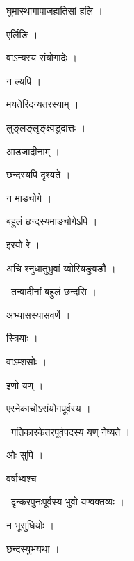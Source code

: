 \documentclass[10pt, openany, oneside]{book}
\begin{document}
\noindent घुमास्थागापाजहातिसां हलि ।

\noindent एर्लिङि ।

\noindent वाऽन्यस्य संयोगादेः ।

\noindent न ल्यपि ।

\noindent मयतेरिदन्यतरस्याम् ।

\noindent लुङ्लङ्लृङ्क्ष्वडुदात्तः ।

\noindent आडजादीनाम् ।

\noindent छन्दस्यपि दृश्यते ।

\noindent न माङ्योगे ।

\noindent बहुलं छन्दस्यमाङ्योगेऽपि ।

\noindent इरयो रे ।

\noindent अचि श्नुधातुभ्रुवां य्वोरियङुवङौ ।

\par\noindent\hspace{1.5em}{\vps वा॰}~{\qt तन्वादीनां बहुलं छन्दसि ।}

\noindent अभ्यासस्यासवर्णे ।

\noindent स्त्रियाः ।

\noindent वाऽम्शसोः ।

\noindent इणो यण् ।

\noindent एरनेकाचोऽसंयोगपूर्वस्य ।

\par\noindent\hspace{1.5em}{\vps वा॰}~{\qt गतिकारकेतरपूर्वपदस्य यण् नेष्यते ।}

\noindent ओः सुपि ।

\noindent वर्षाभ्वश्च ।

\par\noindent\hspace{1.5em}{\vps वा॰}~{\qt दृन्करपुनःपूर्वस्य भुवो यण्वक्तव्यः ।}

\noindent न भूसुधियोः ।

\noindent छन्दस्युभयथा ।
\end{document}
